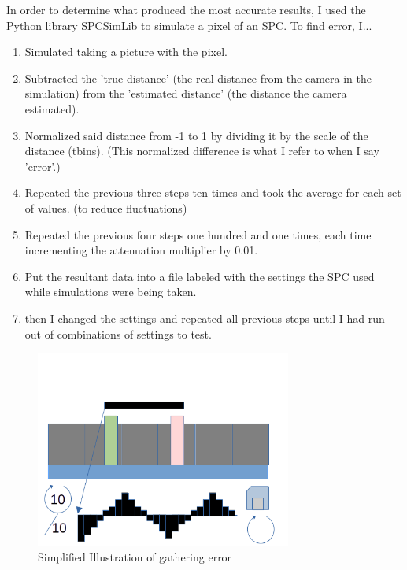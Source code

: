 \documentclass[aspectratio=169]{beamer}
\begin{document}
\begin{frame}
\end{frame}

\begin{frame}
  In order to determine what produced the most accurate results, I used the Python library SPCSimLib \cite{spc} to simulate a pixel of an SPC. To find error, I...
  \begin{enumerate}
    \color{Blue}
  \item Simulated taking a picture with the pixel.
  \item Subtracted the 'true distance' (the real distance from the camera in the simulation) from the 'estimated distance' (the distance the camera estimated).
  \item Normalized said distance from -1 to 1 by dividing it by the scale of the distance (tbins). (This normalized difference is what I refer to when I say 'error'.)
  \item Repeated the previous three steps ten times and took the average for each set of values. (to reduce fluctuations)
  \item Repeated the previous four steps one hundred and one times, each time incrementing the attenuation multiplier by 0.01.
  \item Put the resultant data into a file labeled  with the settings the SPC used while simulations were being taken.
  \item then I changed the settings and repeated all previous steps until I had run out of combinations of settings to test.
  \end{enumerate}
\end{frame}

\begin{frame}
  \begin{figure}[H]
    \centering
    \includegraphics[width=0.75\textwidth]{ErrorIllustration.png}
    \caption{\label{fig:Data}\color{Blue}Simplified Illustration of gathering error}
  \end{figure}
\end{frame}
\end{document}

